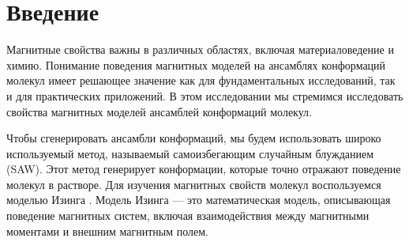 \section{Введение}
Магнитные свойства важны в различных областях, включая материаловедение и химию. Понимание поведения магнитных моделей на ансамблях конформаций молекул имеет решающее значение как для фундаментальных исследований, так и для практических приложений. В этом исследовании мы стремимся исследовать свойства магнитных моделей ансамблей конформаций молекул.

Чтобы сгенерировать ансамбли конформаций, мы будем использовать широко используемый метод, называемый самоизбегающим случайным блужданием (SAW). Этот метод генерирует конформации, которые точно отражают поведение молекул в растворе. Для изучения магнитных свойств молекул воспользуемся моделью Изинга \cite{ising}. Модель Изинга — это математическая модель, описывающая поведение магнитных систем, включая взаимодействия между магнитными моментами и внешним магнитным полем.

